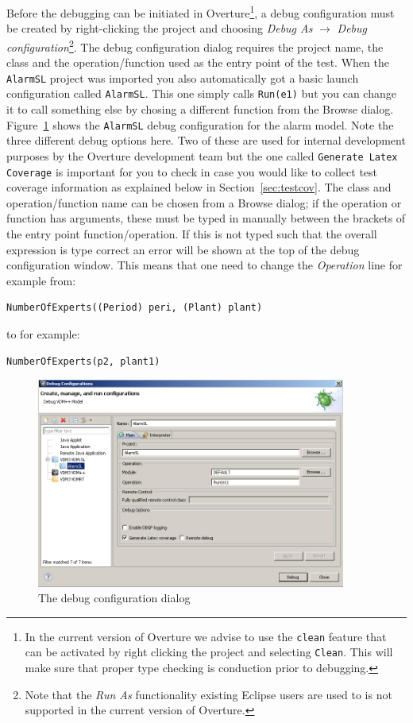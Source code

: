 Before the debugging can be initiated in Overture\footnote{In the
  current version of Overture we advise to use the \texttt{clean}
  feature that can be activated by right clicking the project and
  selecting \texttt{Clean}. This will make sure that proper type
  checking is conduction prior to debugging.}, a debug
configuration must be created by right-clicking the project and
choosing \emph{Debug As} $ \rightarrow $ \emph{Debug
configuration}\footnote{Note that the
  \emph{Run As} functionality existing Eclipse users are used to is
  not supported in the current version of Overture.}. 
The debug configuration dialog requires the project
name, the class and the operation/function used as the entry point of the
test. When the \texttt{AlarmSL} project was imported you also
automatically got a basic launch configuration called
\texttt{AlarmSL}. This one simply calls \texttt{Run(e1)} but you can
change it to call something else by chosing a different function from
the Browse dialog.
Figure~\ref{fig:debugConfiguration} shows the \texttt{AlarmSL} debug
configuration for the alarm model. Note the three different debug
options here. Two of these are used for internal development purposes
by the Overture development team but the one called \texttt{Generate
  Latex Coverage} is important for you to check in case you would like
to collect test coverage information as explained below in
Section~\ref{sec:testcov}. The class and operation/function
name can be chosen from a Browse dialog; if the operation or function
has arguments, these must be typed in manually between the brackets of
the entry point function/operation. If this is not typed such that the
overall expression is type correct an error will be shown at the top
of the debug configuration window. This means that one need to change
the \emph{Operation} line for example from:
  
\begin{lstlisting}
NumberOfExperts((Period) peri, (Plant) plant)
\end{lstlisting}
\noindent to for example:
\begin{lstlisting}
NumberOfExperts(p2, plant1)
\end{lstlisting}

\begin{figure}[htp]
\begin{center}
  \includegraphics[width=4in]{figures/debuglauncer}
  \caption{The debug configuration dialog}
  \label{fig:debugConfiguration}
\end{center}
\end{figure}

